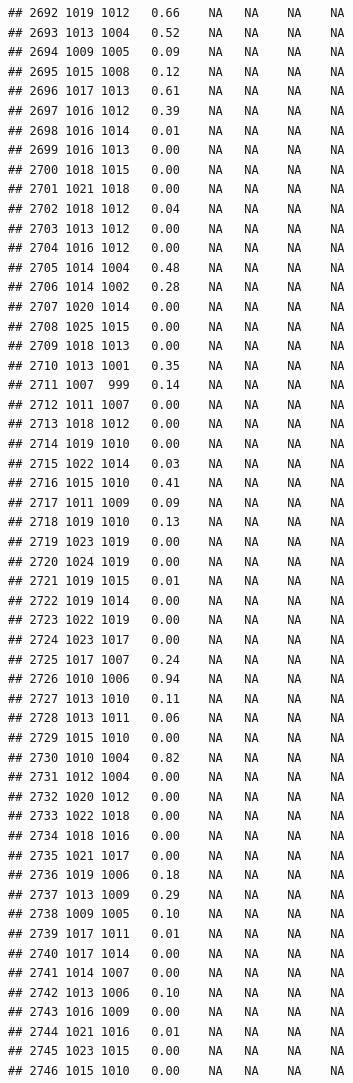 \documentclass{article}\usepackage{graphicx, color}
\makeatletter
\newenvironment{kframe}{%
 \def\at@end@of@kframe{}%
 \ifinner\ifhmode%
  \def\at@end@of@kframe{\end{minipage}}%
  \begin{minipage}{\columnwidth}%
 \fi\fi%
 \def\FrameCommand##1{\hskip\@totalleftmargin \hskip-\fboxsep
 \colorbox{shadecolor}{##1}\hskip-\fboxsep
     \hskip-\linewidth \hskip-\@totalleftmargin \hskip\columnwidth}%
 \MakeFramed {\advance\hsize-\width
   \@totalleftmargin\z@ \linewidth\hsize
   \@setminipage}}%
 {\par\unskip\endMakeFramed%
 \at@end@of@kframe}
\newenvironment{knitrout}{}{} %
\makeatother
\begin{document}
\begin{knitrout}
\begin{kframe}
\begin{verbatim}
## 2692 1019 1012   0.66    NA   NA    NA    NA
## 2693 1013 1004   0.52    NA   NA    NA    NA
## 2694 1009 1005   0.09    NA   NA    NA    NA
## 2695 1015 1008   0.12    NA   NA    NA    NA
## 2696 1017 1013   0.61    NA   NA    NA    NA
## 2697 1016 1012   0.39    NA   NA    NA    NA
## 2698 1016 1014   0.01    NA   NA    NA    NA
## 2699 1016 1013   0.00    NA   NA    NA    NA
## 2700 1018 1015   0.00    NA   NA    NA    NA
## 2701 1021 1018   0.00    NA   NA    NA    NA
## 2702 1018 1012   0.04    NA   NA    NA    NA
## 2703 1013 1012   0.00    NA   NA    NA    NA
## 2704 1016 1012   0.00    NA   NA    NA    NA
## 2705 1014 1004   0.48    NA   NA    NA    NA
## 2706 1014 1002   0.28    NA   NA    NA    NA
## 2707 1020 1014   0.00    NA   NA    NA    NA
## 2708 1025 1015   0.00    NA   NA    NA    NA
## 2709 1018 1013   0.00    NA   NA    NA    NA
## 2710 1013 1001   0.35    NA   NA    NA    NA
## 2711 1007  999   0.14    NA   NA    NA    NA
## 2712 1011 1007   0.00    NA   NA    NA    NA
## 2713 1018 1012   0.00    NA   NA    NA    NA
## 2714 1019 1010   0.00    NA   NA    NA    NA
## 2715 1022 1014   0.03    NA   NA    NA    NA
## 2716 1015 1010   0.41    NA   NA    NA    NA
## 2717 1011 1009   0.09    NA   NA    NA    NA
## 2718 1019 1010   0.13    NA   NA    NA    NA
## 2719 1023 1019   0.00    NA   NA    NA    NA
## 2720 1024 1019   0.00    NA   NA    NA    NA
## 2721 1019 1015   0.01    NA   NA    NA    NA
## 2722 1019 1014   0.00    NA   NA    NA    NA
## 2723 1022 1019   0.00    NA   NA    NA    NA
## 2724 1023 1017   0.00    NA   NA    NA    NA
## 2725 1017 1007   0.24    NA   NA    NA    NA
## 2726 1010 1006   0.94    NA   NA    NA    NA
## 2727 1013 1010   0.11    NA   NA    NA    NA
## 2728 1013 1011   0.06    NA   NA    NA    NA
## 2729 1015 1010   0.00    NA   NA    NA    NA
## 2730 1010 1004   0.82    NA   NA    NA    NA
## 2731 1012 1004   0.00    NA   NA    NA    NA
## 2732 1020 1012   0.00    NA   NA    NA    NA
## 2733 1022 1018   0.00    NA   NA    NA    NA
## 2734 1018 1016   0.00    NA   NA    NA    NA
## 2735 1021 1017   0.00    NA   NA    NA    NA
## 2736 1019 1006   0.18    NA   NA    NA    NA
## 2737 1013 1009   0.29    NA   NA    NA    NA
## 2738 1009 1005   0.10    NA   NA    NA    NA
## 2739 1017 1011   0.01    NA   NA    NA    NA
## 2740 1017 1014   0.00    NA   NA    NA    NA
## 2741 1014 1007   0.00    NA   NA    NA    NA
## 2742 1013 1006   0.10    NA   NA    NA    NA
## 2743 1016 1009   0.00    NA   NA    NA    NA
## 2744 1021 1016   0.01    NA   NA    NA    NA
## 2745 1023 1015   0.00    NA   NA    NA    NA
## 2746 1015 1010   0.00    NA   NA    NA    NA

\end{verbatim}
\end{kframe}
\end{knitrout}
\end{document}
